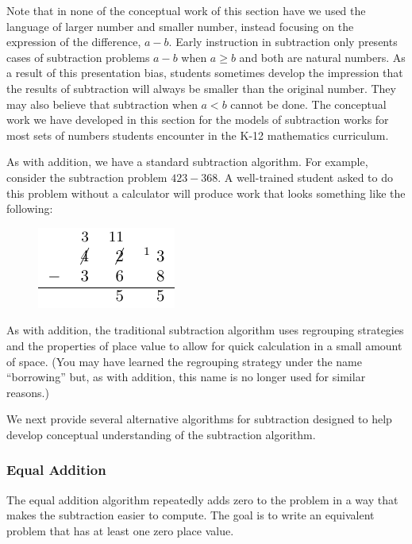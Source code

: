 \documentclass[
]{book}
\theoremstyle{definition}
\theoremstyle{definition}
\theoremstyle{definition}
\theoremstyle{definition}
\theoremstyle{remark}
\begin{document}
Note that in none of the conceptual work of this section have we used the language of larger number and smaller number, instead focusing on the expression of the difference, \(a-b\). Early instruction in subtraction only presents cases of subtraction problems \(a-b\) when \(a\geq b\) and both are natural numbers. As a result of this presentation bias, students sometimes develop the impression that the results of subtraction will always be smaller than the original number. They may also believe that subtraction when \(a<b\) cannot be done. The conceptual work we have developed in this section for the models of subtraction works for most sets of numbers students encounter in the K-12 mathematics curriculum.

As with addition, we have a standard subtraction algorithm. For example, consider the subtraction problem \(423-368\). A well-trained student asked to do this problem without a calculator will produce work that looks something like the following:

\begin{figure}

{\centering \includegraphics[width=0.3\linewidth]{tikz/subtraction-model-algorithm} 

}

\end{figure}

As with addition, the traditional subtraction algorithm uses regrouping strategies and the properties of place value to allow for quick calculation in a small amount of space. (You may have learned the regrouping strategy under the name ``borrowing'' but, as with addition, this name is no longer used for similar reasons.)

We next provide several alternative algorithms for subtraction designed to help develop conceptual understanding of the subtraction algorithm.

\hypertarget{equal-addition}{%
\subsubsection*{Equal Addition}\label{equal-addition}}

The equal addition algorithm repeatedly adds zero to the problem in a way that makes the subtraction easier to compute. The goal is to write an equivalent problem that has at least one zero place value.
\end{document}
